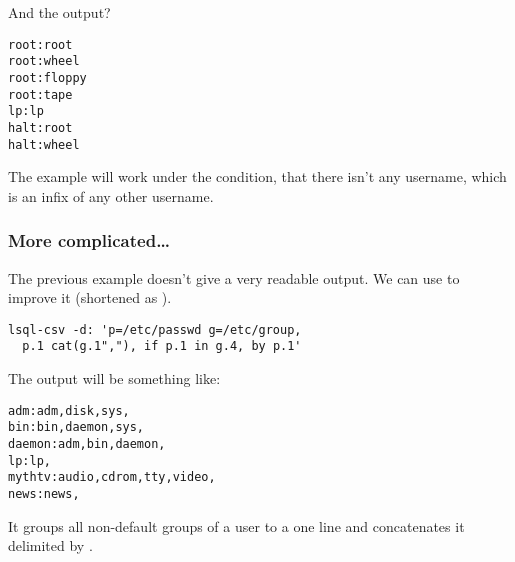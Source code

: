 And the output?
\begin{verbatim}
root:root                                                                                                                                                                                                                                                                 
root:wheel                                                                                                                                                                                                                                                                
root:floppy                                                                                                                                                                                                                                                               
root:tape                                                                                                                                                                                                                                                                 
lp:lp                                                                                                                                                                                                                                                                     
halt:root                                                                                                                                                                                                                                                                 
halt:wheel 
\end{verbatim}

The example will work under the condition, that there isn't any username, which is an infix of any other username.

\subsubsection{More complicated\ldots{}}
The previous example doesn't give a very readable output. We can use  to improve it (shortened as ).
\begin{verbatim}
lsql-csv -d: 'p=/etc/passwd g=/etc/group, 
  p.1 cat(g.1","), if p.1 in g.4, by p.1'
\end{verbatim}
The output will be something like:
\begin{verbatim}
adm:adm,disk,sys,
bin:bin,daemon,sys,
daemon:adm,bin,daemon,
lp:lp,
mythtv:audio,cdrom,tty,video,
news:news,
\end{verbatim}
It groups all non-default groups of a user to a one line and concatenates it delimited by \icode{,}.

